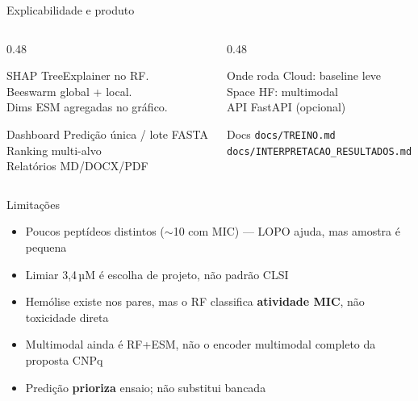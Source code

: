 \documentclass[aspectratio=169,10pt]{beamer}
\begin{document}
\begin{frame}{Explicabilidade e produto}
\begin{columns}[T]
\begin{column}{0.48\textwidth}
\begin{block}{SHAP}
TreeExplainer no RF.\\
Beeswarm global + local.\\
Dims ESM agregadas no gráfico.
\end{block}
\vspace{0.2cm}
\begin{block}{Dashboard}
Predição única / lote FASTA\\
Ranking multi-alvo\\
Relatórios MD/DOCX/PDF
\end{block}
\end{column}
\begin{column}{0.48\textwidth}
\begin{block}{Onde roda}
Cloud: baseline leve\\
Space HF: multimodal\\
API FastAPI (opcional)
\end{block}
\vspace{0.2cm}
\begin{block}{Docs}
\texttt{docs/TREINO.md}\\
\texttt{docs/INTERPRETACAO\_RESULTADOS.md}
\end{block}
\end{column}
\end{columns}
\end{frame}

\begin{frame}{Limitações}
\begin{itemize}
  \item Poucos peptídeos distintos ($\sim$10 com MIC) --- LOPO ajuda, mas amostra é pequena
  \item Limiar 3,4\,µM é escolha de projeto, não padrão CLSI
  \item Hemólise existe nos pares, mas o RF classifica \textbf{atividade MIC}, não toxicidade direta
  \item Multimodal ainda é RF+ESM, não o encoder multimodal completo da proposta CNPq
  \item Predição \textbf{prioriza} ensaio; não substitui bancada
\end{itemize}
\end{frame}
\end{document}
